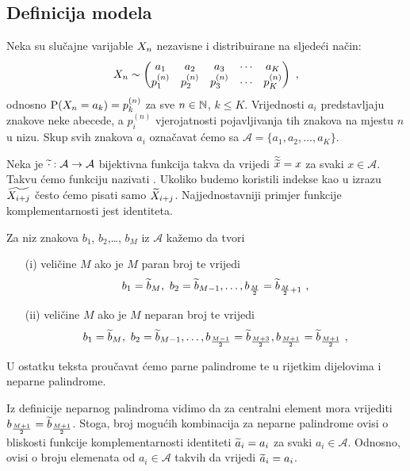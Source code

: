 \subsection{Definicija modela}
\label{pal:sec:defmodela}

Neka su slučajne varijable $\tsvar{X}_n$
nezavisne i distribuirane na sljedeći način:
\[
	\tsvar{X}_n \sim
	\begin{pmatrix}
	a_1 & a_2 & a_3 & \cdots & a_K \\
	p_{1}^{(n)} & p_{2}^{(n)} & p_{3}^{(n)} & \cdots & p_{K}^{(n)} \\
	\end{pmatrix}
	\ ,
\]
odnosno $\vP (\tsvar{X}_n = a_k) = p_{k}^{(n)}$ za sve $n \in \mathbb{N}$,
$k \leq K$. Vrijednosti
$a_i$ predstavljaju znakove neke abecede, a $p_{i}^{(n)}$ vjerojatnosti
pojavljivanja tih znakova na mjestu $n$ u nizu. Skup svih znakova $a_i$
označavat ćemo sa $\mathcal{A} = \{a_1, a_2, \ldots, a_K \}$.

Neka je $\widetilde{\cdot} : \mathcal{A} \rightarrow \mathcal{A}$ 
bijektivna funkcija
takva da vrijedi $\widetilde{\widetilde{x}} = x $ za svaki $x \in \mathcal{A}$.
Takvu ćemo funkciju nazivati
.
Ukoliko budemo koristili indekse kao u izrazu $\ol{\tsvar{X}_{i+j}}$
često ćemo pisati samo $\ol{\tsvar{X}}_{i+j}$.
Najjednostavniji primjer funkcije komplementarnosti jest identiteta.

\begin{defn}
	\label{df:palindrom}
	Za niz znakova $b_1$, $b_2$,\ldots, $b_M$ iz $\mathcal{A}$
	kažemo da tvori
	\begin{itemize}
		\item[(i)]{
			veličine $M$ ako je $M$ paran broj te vrijedi
			$$
			b_1 = \widetilde{b}_M,\ b_2 = \widetilde{b}_{M-1}, \ldots,
			b_{\frac{M}{2}} = \widetilde{b}_{\frac{M}{2} +1}
			\ ,$$}
		\item[(ii)]{
			veličine $M$ ako je $M$ neparan broj te vrijedi
			$$
			b_1 = \ol{b}_M,\ b_2 = \ol{b}_{M-1}, \ldots,
			b_{\frac{M-1}{2}} = \ol{b}_{\frac{M+3}{2}},
			b_{\frac{M+1}{2}} = \ol{b}_{\frac{M+1}{2}}
			\ ,$$}
	\end{itemize}
\end{defn}

U ostatku teksta proučavat ćemo parne palindrome te u
rijetkim dijelovima i neparne palindrome.

\begin{napomena_}
	\label{nap:neparnipalindromidentiteta}
	Iz definicije neparnog palindroma vidimo da za centralni
	element mora vrijediti $b_{\frac{M+1}{2}} = \widetilde{b}_{\frac{M+1}{2}}$.
	Stoga, broj mogućih kombinacija za neparne palindrome
	ovisi o bliskosti funkcije komplementarnosti 
	identiteti $\widetilde{a}_i = a_i$ za svaki $a_i \in \mathcal{A}$.
	Odnosno, ovisi o broju elemenata od $a_i \in \mathcal{A}$ takvih
	da vrijedi $\widetilde{a}_i = a_i$.
\end{napomena_}

